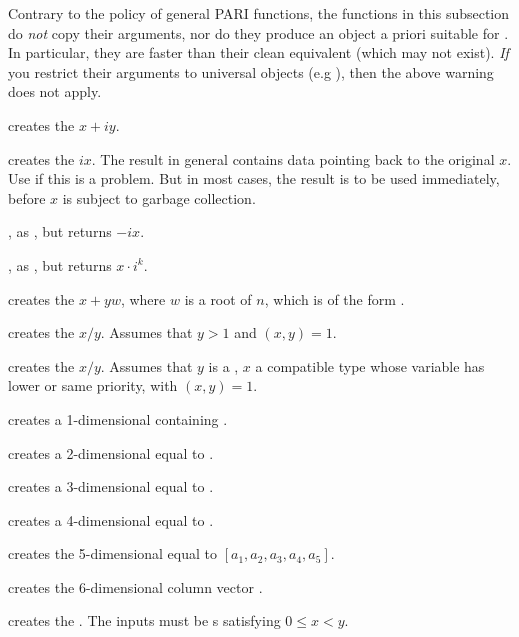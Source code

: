 \label{se:unclean}

Contrary to the policy of general PARI functions, the functions in this
subsection do \emph{not} copy their arguments, nor do they produce an object
a priori suitable for . In particular, they are
faster than their clean equivalent (which may not exist). \emph{If} you
restrict their arguments to universal objects (e.g ),
then the above warning does not apply.

 creates the  $x + iy$.

 creates the  $ix$. The result in
general contains data pointing back to the original $x$. Use  if
this is a problem. But in most cases, the result is to be used immediately,
before $x$ is subject to garbage collection.

, as , but returns $-ix$.

, as , but returns
$x \cdot i^k$.

 creates the  $x + yw$,
where $w$ is a root of $n$, which is of the form .

 creates the  $x/y$. Assumes that
$y > 1$ and $(x,y) = 1$.

 creates the  $x/y$. Assumes
that $y$ is a , $x$ a compatible type whose variable has lower
or same priority, with $(x,y) = 1$.

 creates a 1-dimensional  containing .

 creates a 2-dimensional  equal to
\kbd{[x,y]}.

 creates a 3-dimensional 
equal to \kbd{[x,y,z]}.

 creates a 4-dimensional 
equal to \kbd{[x,y,z,t]}.

 creates the
5-dimensional  equal to $[a_1,a_2,a_3,a_4,a_5]$.

creates the $6$-dimensional column vector \kbd{[x,y,z,t,u,v]~}.

 creates the  .
The inputs must be s satisfying $0 \leq x < y$.

